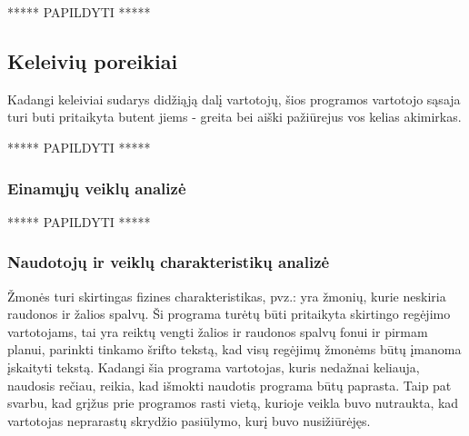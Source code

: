 \documentclass{VUMIFPSkursinis}
\begin{document}
\centerline{***** PAPILDYTI *****}

\subsection{Keleivių poreikiai}
Kadangi keleiviai sudarys didžiąją dalį vartotojų, šios programos vartotojo sąsaja turi buti pritaikyta butent jiems - greita bei aiški pažiūrejus vos kelias akimirkas.
\centerline{***** PAPILDYTI *****}

\subsubsection{Einamųjų veiklų analizė}
\centerline{***** PAPILDYTI *****}

\subsubsection{Naudotojų ir veiklų charakteristikų analizė}
Žmonės turi skirtingas fizines charakteristikas, pvz.: yra žmonių, kurie neskiria raudonos ir žalios spalvų. Ši programa turėtų būti pritaikyta skirtingo regėjimo vartotojams, tai yra reiktų vengti žalios ir raudonos spalvų fonui ir pirmam planui, parinkti tinkamo šrifto tekstą, kad visų regėjimų žmonėms būtų įmanoma įskaityti tekstą.
Kadangi šia programa vartotojas, kuris nedažnai keliauja, naudosis rečiau, reikia, kad išmokti naudotis programa būtų paprasta. Taip pat svarbu, kad grįžus prie programos rasti vietą, kurioje veikla buvo nutraukta, kad vartotojas neprarastų skrydžio pasiūlymo, kurį buvo nusižiūrėjęs.
\end{document}
